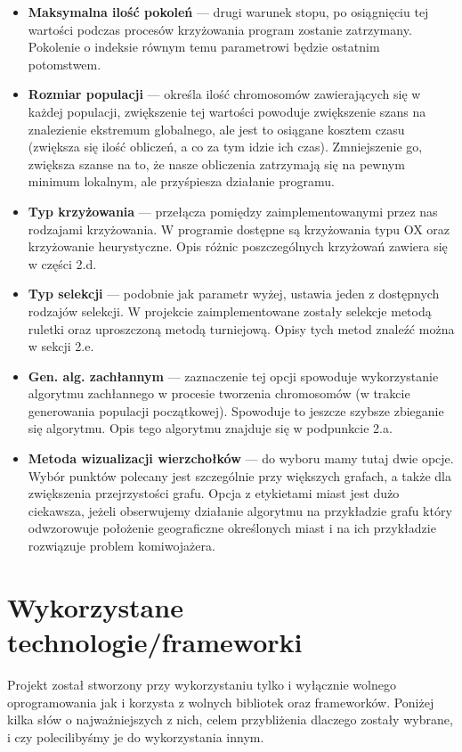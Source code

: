 \documentclass[a4paper]{article}
\begin{document}
\begin{itemize}
 \item \textbf{Maksymalna ilość pokoleń} --- drugi warunek stopu, po osiągnięciu tej wartości podczas procesów krzyżowania program zostanie zatrzymany. Pokolenie o indeksie równym temu parametrowi będzie ostatnim potomstwem.

 \item \textbf{Rozmiar populacji} --- określa ilość chromosomów zawierających się w każdej populacji, zwiększenie tej wartości powoduje zwiększenie szans na znalezienie ekstremum globalnego, ale jest to osiągane kosztem czasu (zwiększa się ilość obliczeń, a co za tym idzie ich czas). Zmniejszenie go, zwiększa szanse na to, że nasze obliczenia zatrzymają się na pewnym minimum lokalnym, ale przyśpiesza działanie programu.

 \item \textbf{Typ krzyżowania} --- przełącza pomiędzy zaimplementowanymi przez nas rodzajami krzyżowania. W programie dostępne są krzyżowania typu OX oraz krzyżowanie heurystyczne. Opis różnic poszczególnych krzyżowań zawiera się w części 2.d.

 \item \textbf{Typ selekcji} --- podobnie jak parametr wyżej, ustawia jeden z dostępnych rodzajów selekcji. W projekcie zaimplementowane zostały selekcje metodą ruletki oraz uproszczoną metodą turniejową. Opisy tych metod znaleźć można w sekcji 2.e.

 \item \textbf{Gen. alg. zachłannym} --- zaznaczenie tej opcji spowoduje wykorzystanie algorytmu zachłannego w procesie tworzenia chromosomów (w trakcie generowania populacji początkowej). Spowoduje to jeszcze szybsze zbieganie się algorytmu. Opis tego algorytmu znajduje się w podpunkcie 2.a.

 \item \textbf{Metoda wizualizacji wierzchołków} --- do wyboru mamy tutaj dwie opcje. Wybór punktów polecany jest szczególnie przy większych grafach, a także dla zwiększenia przejrzystości grafu. Opcja z etykietami miast jest dużo ciekawsza, jeżeli obserwujemy działanie algorytmu na przykładzie grafu który odwzorowuje położenie geograficzne określonych miast i na ich przykładzie rozwiązuje problem komiwojażera.
\end{itemize}


\newpage
\section{Wykorzystane technologie/frameworki}
Projekt został stworzony przy wykorzystaniu tylko i wyłącznie wolnego oprogramowania jak i korzysta z wolnych bibliotek oraz frameworków. Poniżej kilka słów o najważniejszych z nich, celem przybliżenia dlaczego zostały wybrane, i czy polecilibyśmy je do wykorzystania innym.
\end{document}
